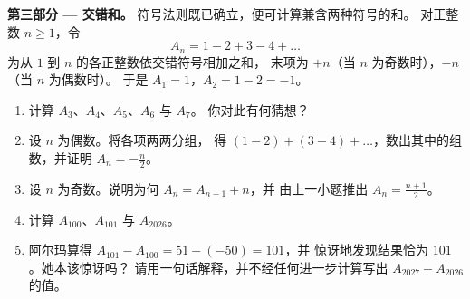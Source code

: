 \begin{problem}
\medskip
\noindent\textbf{第三部分 --- 交错和。}
符号法则既已确立，便可计算兼含两种符号的和。
对正整数 $n \geq 1$，令
\[
A_n = 1 - 2 + 3 - 4 + \dots
\]
为从 $1$ 到 $n$ 的各正整数依交错符号相加之和，
末项为 $+n$（当 $n$ 为奇数时），$-n$（当 $n$ 为偶数时）。
于是 $A_1 = 1$，$A_2 = 1 - 2 = -1$。
\begin{enumerate}[resume]
  \item 计算 $A_3$、$A_4$、$A_5$、$A_6$ 与 $A_7$。
        你对此有何猜想？
  \item 设 $n$ 为偶数。将各项两两分组，
        得 $(1 - 2) + (3 - 4) + \dots$，数出其中的组数，并证明
        $A_n = -\frac{n}{2}$。
  \item 设 $n$ 为奇数。说明为何 $A_n = A_{n-1} + n$，并
        由上一小题推出
        $A_n = \frac{n + 1}{2}$。
  \item 计算 $A_{100}$、$A_{101}$ 与 $A_{2026}$。
  \item 阿尔玛算得 $A_{101} - A_{100} = 51 - (-50) = 101$，并
        惊讶地发现结果恰为 $101$。她本该惊讶吗？
        请用一句话解释，并不经任何进一步计算写出
        $A_{2027} - A_{2026}$ 的值。
\end{enumerate}
\end{problem}
